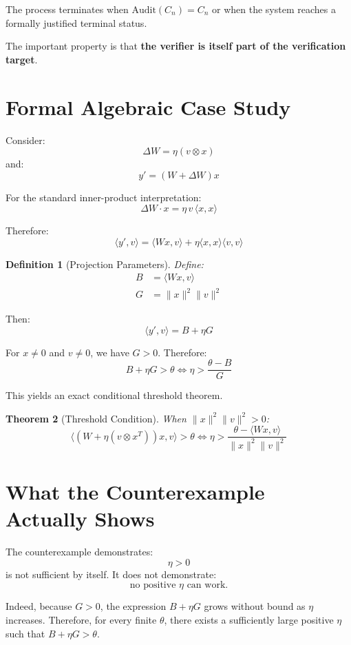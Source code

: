 \documentclass[11pt,a4paper]{article}
\newtheorem{theorem}{Theorem}
\newtheorem{definition}[theorem]{Definition}
\begin{document}
The process terminates when $\text{Audit}(C_n) = C_n$ or when the system reaches a formally justified terminal status.

The important property is that \textbf{the verifier is itself part of the verification target}.

\section{Formal Algebraic Case Study}

Consider:
\[
\Delta W = \eta(v \otimes x)
\]
and:
\[
y' = (W + \Delta W)x
\]

For the standard inner-product interpretation:
\[
\Delta W \cdot x = \eta \, v \, \langle x, x \rangle
\]

Therefore:
\[
\langle y', v \rangle = \langle Wx, v \rangle + \eta \langle x, x \rangle \langle v, v \rangle
\]

\begin{definition}[Projection Parameters]
Define:
\begin{align*}
B &= \langle Wx, v \rangle \\
G &= \|x\|^2 \|v\|^2
\end{align*}
\end{definition}

Then:
\[
\langle y', v \rangle = B + \eta G
\]

For $x \neq 0$ and $v \neq 0$, we have $G > 0$. Therefore:
\[
B + \eta G > \theta \iff \eta > \frac{\theta - B}{G}
\]

This yields an exact conditional threshold theorem.

\begin{theorem}[Threshold Condition]
\label{thr:conditional}
When $\|x\|^2 \|v\|^2 > 0$:
\[
\langle (W + \eta(v \otimes x^T))x, v \rangle > \theta \iff \eta > \frac{\theta - \langle Wx, v \rangle}{\|x\|^2 \|v\|^2}
\]
\end{theorem}

\section{What the Counterexample Actually Shows}

The counterexample demonstrates:
\[
\eta > 0
\]
is not sufficient by itself. It does not demonstrate:
\[
\text{no positive } \eta \text{ can work.}
\]

Indeed, because $G > 0$, the expression $B + \eta G$ grows without bound as $\eta$ increases. Therefore, for every finite $\theta$, there exists a sufficiently large positive $\eta$ such that $B + \eta G > \theta$.
\end{document}
